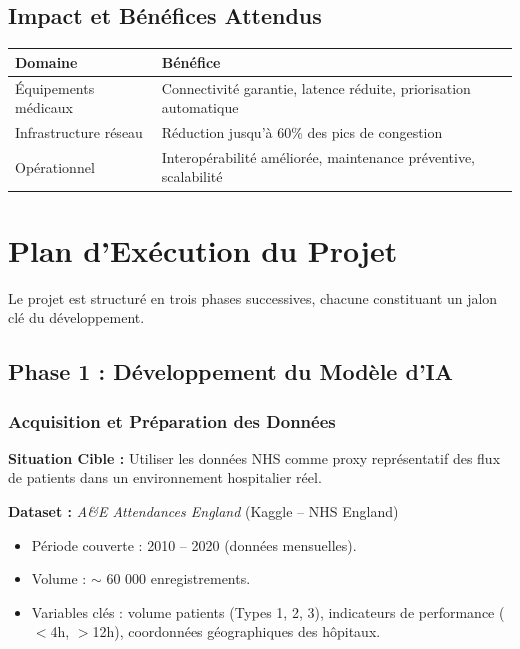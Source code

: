 \documentclass[12pt,a4paper]{article}
\begin{document}
\subsection{Impact et Bénéfices Attendus}

\begin{tabularx}{\linewidth}{|l|X|}
\hline
\rowcolor{primaryblue!15}
\textbf{Domaine} & \textbf{Bénéfice} \\
\hline
Équipements médicaux & Connectivité garantie, latence réduite, priorisation automatique \\
\hline
Infrastructure réseau & Réduction jusqu'à 60\% des pics de congestion \\
\hline
Opérationnel & Interopérabilité améliorée, maintenance préventive, scalabilité \\
\hline
\end{tabularx}

\section{Plan d'Exécution du Projet}

Le projet est structuré en trois phases successives, chacune constituant un jalon clé du développement.

\subsection{Phase 1 : Développement du Modèle d'IA}

\subsubsection{Acquisition et Préparation des Données}

\textbf{Situation Cible :} Utiliser les données NHS comme proxy représentatif des flux de patients dans un environnement hospitalier réel.

\textbf{Dataset :} \textit{A\&E Attendances England} (Kaggle -- NHS England)
\begin{itemize}[leftmargin=1.5cm]
  \item Période couverte : 2010 -- 2020 (données mensuelles).
  \item Volume : $\sim$ 60 000 enregistrements.
  \item Variables clés : volume patients (Types 1, 2, 3), indicateurs de performance ($<$4h, $>$12h), coordonnées géographiques des hôpitaux.
\end{itemize}
\end{document}
